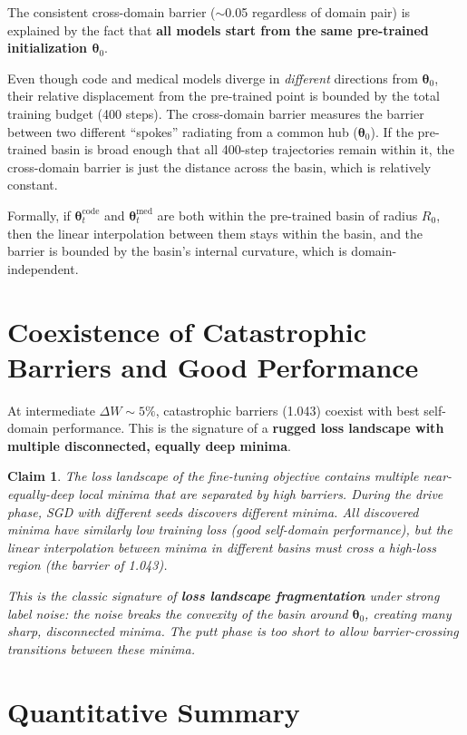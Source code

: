 \documentclass{article}
\newtheorem{claim}{Claim}
\newcommand{\btheta}{\boldsymbol{\theta}}
\begin{document}
The consistent cross-domain barrier ($\sim$0.05 regardless of domain pair)
is explained by the fact that \textbf{all models start from the same
pre-trained initialization $\btheta_0$}.

Even though code and medical models diverge in \emph{different} directions
from $\btheta_0$, their relative displacement from the pre-trained point is
bounded by the total training budget (400 steps).  The cross-domain barrier
measures the barrier between two different ``spokes'' radiating from a
common hub ($\btheta_0$).  If the pre-trained basin is broad enough that
all 400-step trajectories remain within it, the cross-domain barrier is
just the distance across the basin, which is relatively constant.

Formally, if $\btheta_t^{\text{code}}$ and $\btheta_t^{\text{med}}$ are both within
the pre-trained basin of radius $R_0$, then the linear interpolation between
them stays within the basin, and the barrier is bounded by the basin's
internal curvature, which is domain-independent.

\section{Coexistence of Catastrophic Barriers and Good Performance}

At intermediate $\Delta W \sim 5\%$, catastrophic barriers (1.043) coexist
with best self-domain performance.  This is the signature of a
\textbf{rugged loss landscape with multiple disconnected, equally deep minima}.

\begin{claim}
The loss landscape of the fine-tuning objective contains multiple
near-equally-deep local minima that are separated by high barriers.
During the drive phase, SGD with different seeds discovers different
minima.  All discovered minima have similarly low training loss (good
self-domain performance), but the linear interpolation between minima in
different basins must cross a high-loss region (the barrier of 1.043).

This is the classic signature of \textbf{loss landscape fragmentation}
under strong label noise: the noise breaks the convexity of the basin
around $\btheta_0$, creating many sharp, disconnected minima.  The putt
phase is too short to allow barrier-crossing transitions between these
minima.
\end{claim}

\section{Quantitative Summary}
\end{document}
